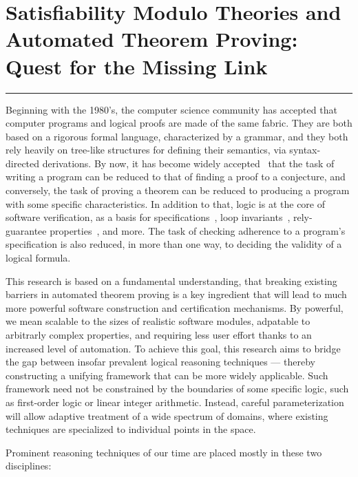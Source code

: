 
\section*{Satisfiability Modulo Theories and Automated Theorem Proving:\\ Quest for the Missing Link}

\vspace{-.5em}
\hrule

\vspace{1.2em}
Beginning with the 1980's, the computer science community has accepted
that computer programs and logical proofs are made of the same fabric.
They are both based on a rigorous formal language, characterized by a grammar,
and they both rely heavily on tree-like structures for defining their semantics,
via syntax-directed derivations.
By now, it has become widely accepted~\cite{curry-howard} that the task of writing a program can be
reduced to that of finding a proof to a conjecture, and conversely, the task of
proving a theorem can be reduced to producing a program with some specific
characteristics.
In addition to that, logic is at the core of software verification, as a basis
for specifications~\cite{dafny,boogie,seahorn}, loop invariants~\cite{ic3,spacer,..}, rely-guarantee properties~\cite{relyguarantee1,..}, and more.
The task of checking adherence to a program's specification is also reduced, in
more than one way, to deciding the validity of a logical formula.

This research is based on a fundamental understanding, that breaking existing
barriers in automated theorem proving is a key ingredient that will lead to
much more powerful software construction and certification mechanisms.
By powerful, we mean scalable to the sizes of realistic software modules,
adpatable to arbitrarly complex properties,
and requiring less user effort thanks to an increased level of automation.
To achieve this goal, this research aims to bridge the gap between insofar prevalent logical reasoning techniques --- thereby constructing a unifying framework that can be more widely applicable.
Such framework need not be constrained by the boundaries of some specific logic, such as first-order logic or linear integer arithmetic.
Instead, careful parameterization will allow adaptive treatment of a wide spectrum of domains, where existing techniques are specialized to individual points in the space.

\medskip
Prominent reasoning techniques of our time are placed mostly in these two disciplines:

